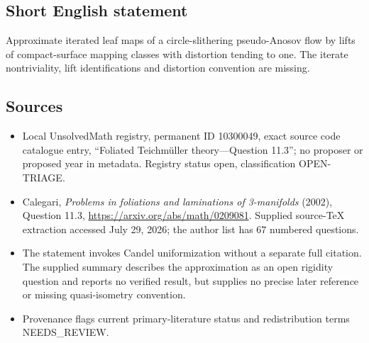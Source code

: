 \documentclass[11pt]{article}
\begin{document}
\subsection{Short English statement}
Approximate iterated leaf maps of a circle-slithering pseudo-Anosov flow by lifts of compact-surface mapping classes with distortion tending to one. The iterate nontriviality, lift identifications and distortion convention are missing.
\subsection{Sources}
\begin{itemize}
\item Local UnsolvedMath registry, permanent ID 10300049, exact source code catalogue entry, ``Foliated Teichm\"uller theory---Question 11.3''; no proposer or proposed year in metadata. Registry status open, classification OPEN-TRIAGE.
\item Calegari, \emph{Problems in foliations and laminations of 3-manifolds} (2002), Question 11.3, \url{https://arxiv.org/abs/math/0209081}. Supplied source-TeX extraction accessed July 29, 2026; the author list has 67 numbered questions.
\item The statement invokes Candel uniformization without a separate full citation. The supplied summary describes the approximation as an open rigidity question and reports no verified result, but supplies no precise later reference or missing quasi-isometry convention.
\item Provenance flags current primary-literature status and redistribution terms NEEDS\_REVIEW.
\end{itemize}
\end{document}
